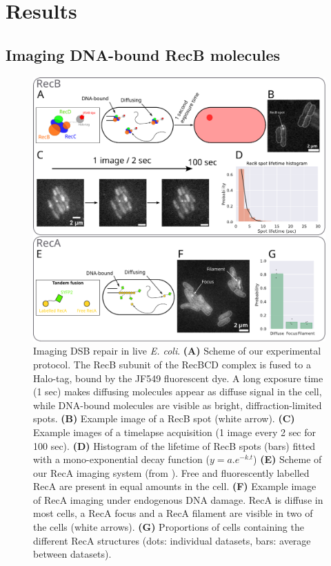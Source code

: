 \section*{Results}

\subsection*{Imaging DNA-bound RecB molecules}

\begin{figure}[htbp]
    \centering
    \includegraphics[width=\textwidth]{Figures/Fig1_endogenous.pdf}
    \caption{Imaging DSB repair in live \textit{E. coli}. \textbf{(A)} Scheme of our experimental protocol. The RecB subunit of the RecBCD complex is fused to a Halo-tag, bound by the JF549 fluorescent dye. A long exposure time (1 sec) makes diffusing molecules appear as diffuse signal in the cell, while DNA-bound molecules are visible as bright, diffraction-limited spots. \textbf{(B)} Example image of a RecB spot (white arrow). \textbf{(C)} Example images of a timelapse acquisition (1 image every 2 sec for 100 sec). \textbf{(D)} Histogram of the lifetime of RecB spots (bars) fitted with a mono-exponential decay function ($y=a.e^{-k.t}$) \textbf{(E)} Scheme of our RecA imaging system (from \cite{Wiktor2021}). Free and fluorescently labelled RecA are present in equal amounts in the cell. \textbf{(F)} Example image of RecA imaging under endogenous DNA damage. RecA is diffuse in most cells, a RecA focus and a RecA filament are visible in two of the cells (white arrows). \textbf{(G)} Proportions of cells containing the different RecA structures (dots: individual datasets, bars: average between datasets).}
    \label{Fig:endogenous}
\end{figure}

